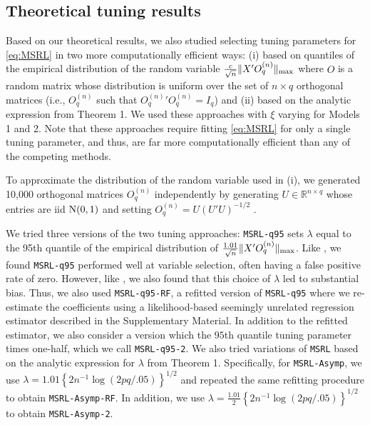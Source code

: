 \documentclass[12pt]{article}
\begin{document}
\subsection{Theoretical tuning results}\label{subsec:TP_sel}
Based on our theoretical results, we also studied selecting tuning parameters for \eqref{eq:MSRL} in two more computationally efficient ways: (i) based on quantiles of the empirical distribution of the random variable $\frac{c}{\sqrt{n}}\|X'O^{(n)}_q\|_{\rm max}$ where $O$ is a random matrix whose distribution is uniform over the set of $n \times q$ orthogonal matrices (i.e., $O^{(n)}_q$ such that ${O^{(n)}_q}'O^{(n)}_q = I_q$) and (ii) based on the analytic expression from Theorem 1. We used these approaches with $\xi$ varying for Models 1 and 2.  Note that these approaches require fitting \eqref{eq:MSRL} for only a single tuning parameter, and thus, are far more computationally efficient than any of the competing methods.

To approximate the distribution of the random variable used in (i), we generated 10,000 orthogonal matrices $O^{(n)}_q$ independently by generating $U \in \mathbb{R}^{n \times q}$ whose entries are iid ${\rm N}(0,1)$ and setting $O^{(n)}_q = U(U'U)^{-1/2}$ \citep{eaton}. 

We tried three versions of the two tuning approaches: \texttt{MSRL-q95} sets $\lambda$ equal to the 95th quantile of the empirical distribution of $\frac{1.01}{\sqrt{n}}\|X'O^{(n)}_q\|_{\rm max}$. Like \citet{belloni2011square}, we found \texttt{MSRL-q95} performed well at variable selection, often having a false positive rate of zero. However, like \citet{belloni2011square}, we also found that this choice of $\lambda$ led to substantial bias. Thus, we also used \texttt{MSRL-q95-RF}, a refitted version of \texttt{MSRL-q95} where we re-estimate the coefficients using a likelihood-based seemingly unrelated regression estimator described in the Supplementary Material. In addition to the refitted estimator, we also consider a version which the $95$th quantile tuning parameter times one-half, which we call \texttt{MSRL-q95-2}. We also tried variations of \texttt{MSRL} based on the analytic expression for $\lambda$ from Theorem 1. Specifically, for \texttt{MSRL-Asymp}, we use $\lambda = 1.01 \left\{2 n^{-1} \log(2 pq /.05)\right\}^{1/2}$ and repeated the same refitting procedure to obtain \texttt{MSRL-Asymp-RF}. In addition, we use $\lambda = \frac{1.01}{2} \left\{2 n^{-1} \log(2 pq /.05)\right\}^{1/2}$ to obtain \texttt{MSRL-Asymp-2}. 
\end{document}
